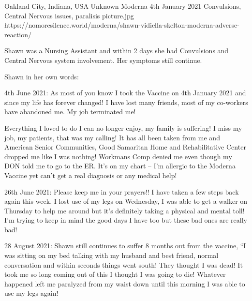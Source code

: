 {Oakland City, Indiana, USA}
{Unknown}
{Moderna}
{4th January 2021}
{Convulsions, Central Nervous issues, paralisis}
{picture.jpg}
{https://nomoresilence.world/moderna/shawn-vidiella-skelton-moderna-adverse-reaction/}
{

Shawn was a Nursing Assistant and within 2 days she had Convulsions and Central
Nervous system involvement. Her symptoms still continue.

Shawn in her own words:

4th June 2021: As most of you know I took the Vaccine on 4th January 2021 and
since my life has forever changed! I have lost many friends, most of my
co-workers have abandoned me. My job terminated me!

Everything I loved to do I can no longer enjoy, my family is suffering! I miss
my job, my patients, that was my calling! It has all been taken from me and
American Senior Communities, Good Samaritan Home and Rehabilitative Center
dropped me like I was nothing! Workmans Comp denied me even though my DON told
me to go to the ER. It’s on my chart – I’m allergic to the Moderna Vaccine yet
can’t get a real diagnosis or any medical help!

26th June 2021: Please keep me in your prayers!! I have taken a few steps back
again this week. I lost use of my legs on Wednesday, I was able to get a walker
on Thursday to help me around but it’s definitely taking a physical and mental
toll! I’m trying to keep in mind the good days I have too but these bad ones are
really bad!

28 August 2021: Shawn still continues to suffer 8 months out from the vaccine,
“I was sitting on my bed talking with my husband and best friend, normal
conversation and within seconds things went south! They thought I was dead! It
took me so long coming out of this I thought I was going to die! Whatever
happened left me paralyzed from my waist down until this morning I was able to
use my legs again!

}
